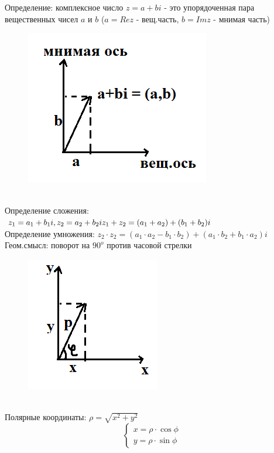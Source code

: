 \documentclass[12pt, oneside]{book}
\theoremstyle{definition}
\begin{document}
\begin{enumerate}
Определение: комплексное число $z = a +bi$ - это упорядоченная пара вещественных чисел $a$ и $b$ ($a = Re z$ - вещ.часть, $b = Im z$ - мнимая часть)\\
\begin{figure}[h!]
\centering
\includegraphics[scale=0.6]{1-2.PNG}
\end{figure}\\
Определение сложения: $z_1 = a_1 + b_1 i, z_2 = a_2 + b_2 i\\
z_1 + z_2 = (a_1 + a_2) + (b_1 + b_2)i$\\
Определение умножения: $z_2 \cdot z_2 = (a_1 \cdot a_2 - b_1 \cdot b_2) + (a_1 \cdot b_2 + b_1 \cdot a_2)i$\\
Геом.смысл: поворот на $90^{o}$ против часовой стрелки\\
\begin{figure}[h!]
\centering
\includegraphics[scale=0.6]{1-3.PNG}
\end{figure}\\
Полярные координаты: $\rho = \sqrt{x^2 +y^2}$
$$\begin{cases}
x = \rho \cdot \cos{\phi}  \\
y = \rho \cdot \sin{\phi}
\end{cases}$$\\
\begin{figure}[h!]

\end{figure}
\end{enumerate}
\end{document}
